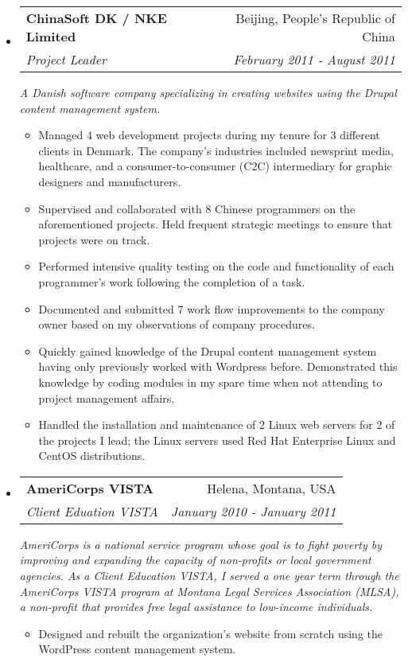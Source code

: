 \documentclass[a4paper,11pt]{article}
\makeatletter
\newcommand{\resitem}[1]{\item #1 \vspace{-2pt}}
\newcommand{\ressubheading}[4]{
\begin{tabular*}{6.5in}{l@{\cftdotfill{\cftsecdotsep}\extracolsep{\fill}}r}
		\textbf{#1} & #2 \\
		\textit{#3} & \textit{#4} \\
\end{tabular*}\vspace{-6pt}}
\makeatother
\begin{document}
\begin{itemize}
\begin{itemize}
	\end{itemize}

\item

	\ressubheading{ChinaSoft DK / NKE Limited}{Beijing, People's Republic of China}{Project Leader}{February 2011 - August 2011}
	\linebreak
	\linebreak
	\emph{A Danish software company specializing in creating websites using the Drupal content management system.}

	\begin{itemize}

			\resitem{Managed 4 web development projects during my tenure for 3 different clients in Denmark. The company’s industries included newsprint media, healthcare, and a consumer-to-consumer (C2C) intermediary for graphic designers and manufacturers.}

			\resitem{Supervised and collaborated with 8 Chinese programmers on the aforementioned projects. Held frequent strategic meetings to ensure that projects were on track.}

			\resitem{Performed intensive quality testing on the code and functionality of each programmer’s work following the completion of a task.}

			\resitem{Documented and submitted 7 work flow improvements to the company owner based on my observations of company procedures.}

			\resitem{Quickly gained knowledge of the Drupal content management system having only previously worked with Wordpress before. Demonstrated this knowledge by coding modules in my spare time when not attending to project management affairs.}

			\resitem{Handled the installation and maintenance of 2 Linux web servers for 2 of the projects I lead; the Linux servers used Red Hat Enterprise Linux and CentOS distributions.}

	\end{itemize}

\item

	\ressubheading{AmeriCorps VISTA}{Helena, Montana, USA}{Client Eduation VISTA}{January 2010 - January 2011}
	\linebreak
	\linebreak
	\emph{AmeriCorps is a national service program whose goal is to fight poverty by improving and expanding the capacity of non-profits or local government agencies. As a Client Education VISTA, I served a one year term through the AmeriCorps VISTA program at Montana Legal Services Association (MLSA), a non-profit that provides free legal assistance to low-income individuals.}
	\begin{itemize}
			\resitem{Designed and rebuilt the organization’s website from scratch using the WordPress content management system.}


\end{itemize}
\end{itemize}
\end{document}
